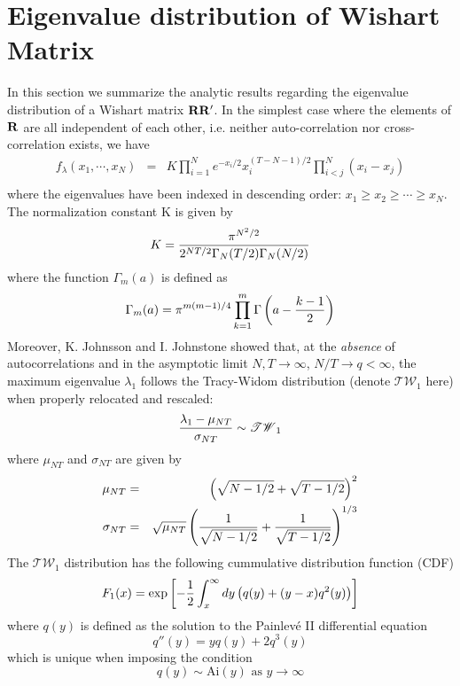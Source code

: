 \documentclass{report}
\begin{document}
\section{Eigenvalue distribution of Wishart Matrix}
\label{sec:wishart_eigen_dist}
In this section we summarize the analytic results regarding the
eigenvalue distribution of a Wishart matrix $\mathbf{RR'}$. In the
simplest case where the elements of $\mathbf{R}$ are all independent of
each other, i.e. neither auto-correlation nor cross-correlation
exists, we have \cite{Chiani2012}
\begin{eqnarray}
  f_{\lambda}(x_1, \cdots, x_N) &=& K \prod_{i=1}^N e^{-x_i/2}
  x_i^{(T-N-1)/2} \prod_{i<j}^N (x_i -
  x_j) \label{eq:wishart_eigen_pdf}\\
\end{eqnarray}
where the eigenvalues have been indexed in descending order: $x_1 \geq
x_2 \geq \cdots \geq x_N$. The normalization constant K is given by
\begin{equation*}
  K = {\pi^{N^2/2} \over 2^{NT/2}\Gamma_N(T/2) \Gamma_N(N/2)}
\end{equation*}
where the function $\Gamma_m(a)$ is defined as
\begin{equation*}
  \Gamma_m(a) = \pi^{m(m-1)/4} \prod_{k=1}^m \Gamma\left(a - {k-1
      \over 2}\right)
\end{equation*}
Moreover, K. Johnsson \cite{Johnsson2000} and I. Johnstone
\cite{Johnstone2001} showed that, at the {\it absence} of
autocorrelations and in the asymptotic limit $N, T \to \infty$, $N/T
\to q < \infty$, the maximum eigenvalue  $\lambda_1$ follows the
Tracy-Widom distribution (denote $\mathscr{TW}_1$ here) when properly
relocated and rescaled:
\begin{equation*}
  {\lambda_1 - \mu_{NT} \over \sigma_{NT}} \sim \mathscr{TW}_1
\end{equation*}
where $\mu_{NT}$ and $\sigma_{NT}$ are given by
\begin{eqnarray*}
  \mu_{NT} &=& \left(
    \sqrt{N-1/2} + \sqrt{T - 1/2}
  \right)^2 \\
  \sigma_{NT} &=& \sqrt{\mu_{NT}} \left(
    {1 \over \sqrt{N-1/2}} + {1 \over \sqrt{T-1/2}}
  \right)^{1/3}
\end{eqnarray*}
The $\mathscr{TW}_1$ distribution has the following cummulative
distribution function (CDF) \cite{Chiani2012}
\begin{equation*}
  F_1(x) = \exp\left[
    -{1 \over 2} \int_x^\infty dy \left(q(y) + (y-x)q^2(y)\right)
  \right]
\end{equation*}
where $q(y)$ is defined as the solution to the Painlev\'e II differential
equation
\begin{equation*}
  q''(y) = yq(y) + 2q^3(y)
\end{equation*}
which is unique when imposing the condition
\begin{equation*}
  q(y) \sim \text{Ai}(y) \text{ as } y \to \infty
\end{equation*}
\end{document}
